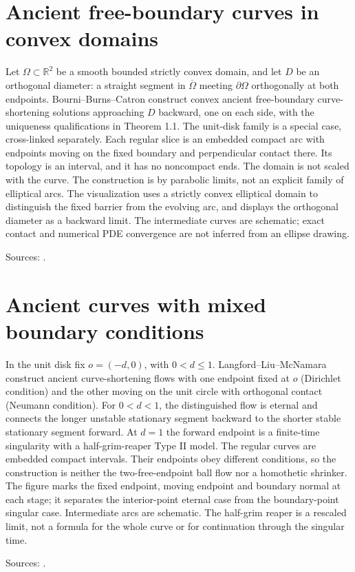 \chapter{Ancient free-boundary curves in convex domains}\label{sec:catalogue-free-boundary-convex-domains}
\begin{example}\label{ex:catalogue-free-boundary-convex-domains}
Let $\Omega\subset\mathbb R^2$ be a smooth bounded strictly convex domain, and let $D$ be an orthogonal diameter: a straight segment in $\overline\Omega$ meeting $\partial\Omega$ orthogonally at both endpoints. Bourni--Burns--Catron construct convex ancient free-boundary curve-shortening solutions approaching $D$ backward, one on each side, with the uniqueness qualifications in Theorem 1.1. The unit-disk family is a special case, cross-linked separately.
Each regular slice is an embedded compact arc with endpoints moving on the fixed boundary and perpendicular contact there. Its topology is an interval, and it has no noncompact ends. The domain is not scaled with the curve. The construction is by parabolic limits, not an explicit family of elliptical arcs. The visualization uses a strictly convex elliptical domain to distinguish the fixed barrier from the evolving arc, and displays the orthogonal diameter as a backward limit. The intermediate curves are schematic; exact contact and numerical PDE convergence are not inferred from an ellipse drawing.
\par Sources: \cite{CatBourniBurnsCatron2025}.
\end{example}

\chapter{Ancient curves with mixed boundary conditions}\label{sec:catalogue-mixed-boundary-ancient-curves}
\begin{example}\label{ex:catalogue-mixed-boundary-ancient-curves}
In the unit disk fix $o=(-d,0)$, with $0<d\le1$. Langford--Liu--McNamara construct ancient curve-shortening flows with one endpoint fixed at $o$ (Dirichlet condition) and the other moving on the unit circle with orthogonal contact (Neumann condition). For $0<d<1$, the distinguished flow is eternal and connects the longer unstable stationary segment backward to the shorter stable stationary segment forward. At $d=1$ the forward endpoint is a finite-time singularity with a half-grim-reaper Type II model.
The regular curves are embedded compact intervals. Their endpoints obey different conditions, so the construction is neither the two-free-endpoint ball flow nor a homothetic shrinker. The figure marks the fixed endpoint, moving endpoint and boundary normal at each stage; it separates the interior-point eternal case from the boundary-point singular case. Intermediate arcs are schematic. The half-grim reaper is a rescaled limit, not a formula for the whole curve or for continuation through the singular time.
\par Sources: \cite{CatLangfordLiuMcNamara2025}.
\end{example}


